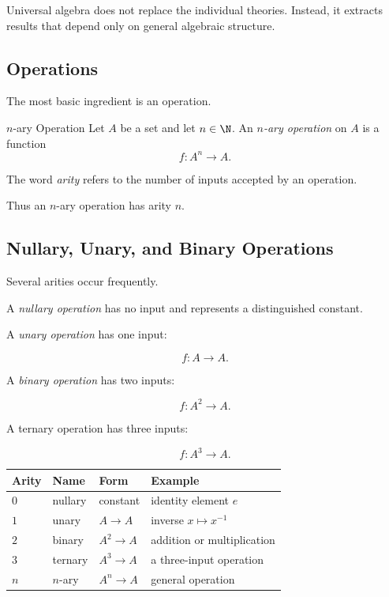 Universal algebra does not replace the individual theories. Instead, it
extracts results that depend only on general algebraic structure.

\subsection{Operations}
\label{subsec:universal-operations}

The most basic ingredient is an operation.

\begin{definitionbox}{\(n\)-ary Operation}
Let \(A\) be a set and let \(n\in\N\). An \emph{\(n\)-ary operation} on
\(A\) is a function
\[ f:A^n\to A. \]
\end{definitionbox}

The word \emph{arity} refers to the number of inputs accepted by an
operation.

Thus an \(n\)-ary operation has arity \(n\).

\subsection{Nullary, Unary, and Binary Operations}
\label{subsec:operation-arities}

Several arities occur frequently.

A \emph{nullary operation} has no input and represents a distinguished
constant.

A \emph{unary operation} has one input:

\[ f:A\to A. \]

A \emph{binary operation} has two inputs:

\[ f:A^2\to A. \]

A ternary operation has three inputs:

\[ f:A^3\to A. \]

\begin{center}
\begin{tabularx}{0.88\textwidth}{@{}lllX@{}}
\toprule
\textbf{Arity} & \textbf{Name} & \textbf{Form} & \textbf{Example}\\
\midrule
\(0\) & nullary & constant & identity element \(e\)\\
\(1\) & unary & \(A\to A\) & inverse \(x\mapsto x^{-1}\)\\
\(2\) & binary & \(A^2\to A\) & addition or multiplication\\
\(3\) & ternary & \(A^3\to A\) & a three-input operation\\
\(n\) & \(n\)-ary & \(A^n\to A\) & general operation\\
\bottomrule
\end{tabularx}
\end{center}

